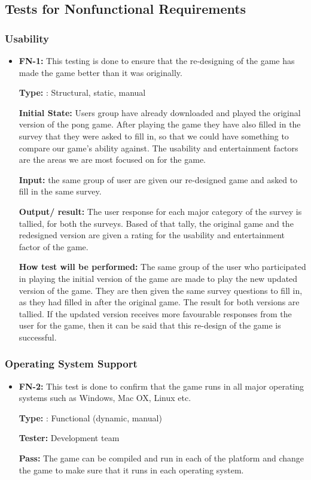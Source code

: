 \documentclass[12pt,letterpaper]{article}
\begin{document}
	\subsection{Tests for Nonfunctional Requirements}
	\subsubsection{Usability}
\begin{reqbox}
	\begin{itemize}
	\item \textbf{FN-1: }This testing is done to ensure that the re-designing of the game has made the game better than it was originally.

	\textbf{Type: }: Structural, static, manual

	\textbf{Initial State: } Users group have already downloaded and played the original version of the pong game. After playing the game they have also filled in the survey that they were asked to fill in, so that we could have something to compare our game’s ability against. The usability and entertainment factors are the areas we are most focused on for the game.

	\textbf{Input: } the same group of user are given our re-designed game and asked to fill in the same survey.

	\textbf{Output/ result: }The user response for each major category of the survey is tallied, for both the surveys. Based of that tally, the original game and the redesigned version are given a rating for the usability and entertainment factor of the game. 

	\textbf{How test will be performed: }The same group of the user who participated in playing the initial version of the game are made to play the new updated version of the game. They are then given the same survey questions to fill in, as they had filled in after the original game. The result for both versions are tallied. If the updated version receives more favourable responses from the user for the game, then it can be said that this re-design of the game is successful.  
	\end{itemize}
\end{reqbox}

	\subsubsection{Operating System Support}
\begin{reqbox}
	\begin{itemize}	
	\item \textbf{FN-2: }This test is done to confirm that the game runs in all major operating systems such as Windows, Mac OX, Linux etc. 

	\textbf{Type: }: Functional (dynamic, manual)

	\textbf{Tester:  }Development team
	
	\textbf{Pass: }The game can be compiled and run in each of the platform and change the game to make sure that it runs in each operating system.
	\end{itemize}
\end{reqbox}
\end{document}
